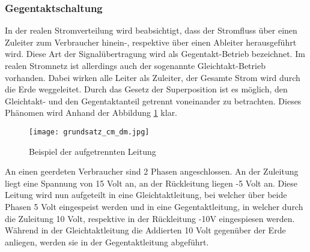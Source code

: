 \subsubsection{Gegentaktschaltung} \label{subsec:gegentakt}

In der realen Stromverteilung wird beabsichtigt, dass der Stromfluss über einen Zuleiter zum Verbraucher hinein-, respektive über einen Ableiter herausgeführt wird. 
Diese Art der Signalübertragung wird als Gegentakt-Betrieb bezeichnet. Im realen Stromnetz ist allerdings auch der sogenannte Gleichtakt-Betrieb vorhanden. Dabei wirken alle Leiter als Zuleiter, der Gesamte Strom wird durch die Erde weggeleitet. Durch das Gesetz der Superposition ist es möglich, den Gleichtakt- und den Gegentaktanteil getrennt voneinander zu betrachten. Dieses Phänomen wird Anhand der Abbildung \ref{fig:auftrennen_der_leitung} klar. 

\begin{figure}[H]
	\centering
	\texttt{[image: grundsatz\_cm\_dm.jpg]}
	\caption{Beispiel der aufgetrennten Leitung}
	\label{fig:auftrennen_der_leitung}
\end{figure} 


An einen geerdeten Verbraucher sind 2 Phasen angeschlossen. An der Zuleitung liegt eine Spannung von 15 Volt an, an der Rückleitung liegen -5 Volt an. Diese Leitung wird nun aufgeteilt in eine Gleichtaktleitung, bei welcher über beide Phasen 5 Volt eingespeist werden und in eine Gegentaktleitung, in welcher durch die Zuleitung 10 Volt, respektive in der Rückleitung -10V eingespiesen werden. Während in der Gleichtaktleitung die Addierten 10 Volt gegenüber der Erde anliegen, werden sie in der Gegentaktleitung abgeführt.



